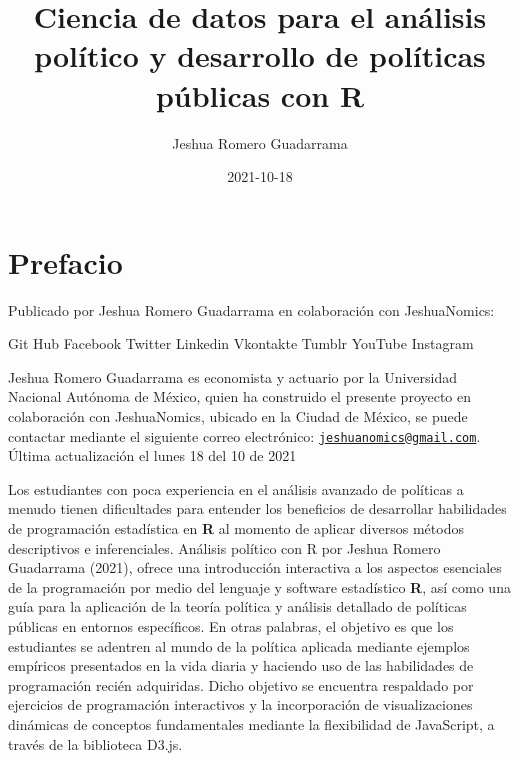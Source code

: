 \documentclass[
]{book}
\title{Ciencia de datos para el análisis político y desarrollo de políticas públicas con R}
\author{Jeshua Romero Guadarrama}
\date{2021-10-18}
\begin{document}
\maketitle

{
\setcounter{tocdepth}{1}
\tableofcontents
}
\hypertarget{prefacio}{%
\chapter*{Prefacio}\label{prefacio}}

Publicado por Jeshua Romero Guadarrama en colaboración con JeshuaNomics:

{ Git Hub}
{ Facebook}
{ Twitter}
{ Linkedin}
{ Vkontakte}
{ Tumblr}
{ YouTube}
{ Instagram}

Jeshua Romero Guadarrama es economista y actuario por la Universidad Nacional Autónoma de México, quien ha construido el presente proyecto en colaboración con JeshuaNomics, ubicado en la Ciudad de México, se puede contactar mediante el siguiente correo electrónico: \href{mailto:jeshuanomics@gmail.com}{\nolinkurl{jeshuanomics@gmail.com}}.
Última actualización el lunes 18 del 10 de 2021

Los estudiantes con poca experiencia en el análisis avanzado de políticas a menudo tienen dificultades para entender los beneficios de desarrollar habilidades de programación estadística en \textbf{R} al momento de aplicar diversos métodos descriptivos e inferenciales. Análisis político con R por Jeshua Romero Guadarrama (2021), ofrece una introducción interactiva a los aspectos esenciales de la programación por medio del lenguaje y software estadístico \textbf{R}, así como una guía para la aplicación de la teoría política y análisis detallado de políticas públicas en entornos específicos. En otras palabras, el objetivo es que los estudiantes se adentren al mundo de la política aplicada mediante ejemplos empíricos presentados en la vida diaria y haciendo uso de las habilidades de programación recién adquiridas. Dicho objetivo se encuentra respaldado por ejercicios de programación interactivos y la incorporación de visualizaciones dinámicas de conceptos fundamentales mediante la flexibilidad de JavaScript, a través de la biblioteca D3.js.
\end{document}
